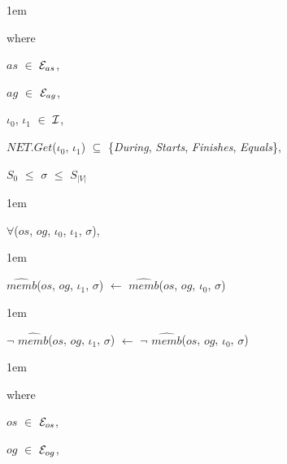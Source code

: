 \documentclass[11pt]{report}
\newenvironment{vquote}
{
  \begin{list}{}{\leftmargin 1em}\item[]
}
{
  \end{list}
}
\begin{document}
\begin{enumerate}
                \begin{vquote}
                  where

                  \hspace{1em}
                  $as$ $\in$ ${\cal E}_{as}$,

                  \hspace{1em}
                  $ag$ $\in$ ${\cal E}_{ag}$,

                  \hspace{1em}
                  $\iota_0$, $\iota_1$ $\in$ ${\cal I}$,

                  \hspace{1em}
                  $NET.Get$($\iota_0$, $\iota_1$) $\subseteq$
                  \{{\em During}, {\em Starts}, {\em Finishes}, {\em Equals}\},

                  \hspace{1em}
                  $S_0$ $\leq$ $\sigma$ $\leq$ $S_{|V|}$
                \end{vquote}

                \vspace{0.5em}

                \begin{vquote}
                  $\forall$($os$, $og$, $\iota_0$, $\iota_1$, $\sigma$),
                \end{vquote}

                \begin{vquote}
                  $\hat{memb}$($os$, $og$, $\iota_1$, $\sigma$)
                  $\leftarrow$
                  $\hat{memb}$($os$, $og$, $\iota_0$, $\sigma$)
                \end{vquote}

                \begin{vquote}
                  $\lnot$ $\hat{memb}$($os$, $og$, $\iota_1$, $\sigma$)
                  $\leftarrow$
                  $\lnot$ $\hat{memb}$($os$, $og$, $\iota_0$, $\sigma$)
                \end{vquote}

                \begin{vquote}
                  where

                  \hspace{1em}
                  $os$ $\in$ ${\cal E}_{os}$,

                  \hspace{1em}
                  $og$ $\in$ ${\cal E}_{og}$,


\end{vquote}
\end{enumerate}
\end{document}
